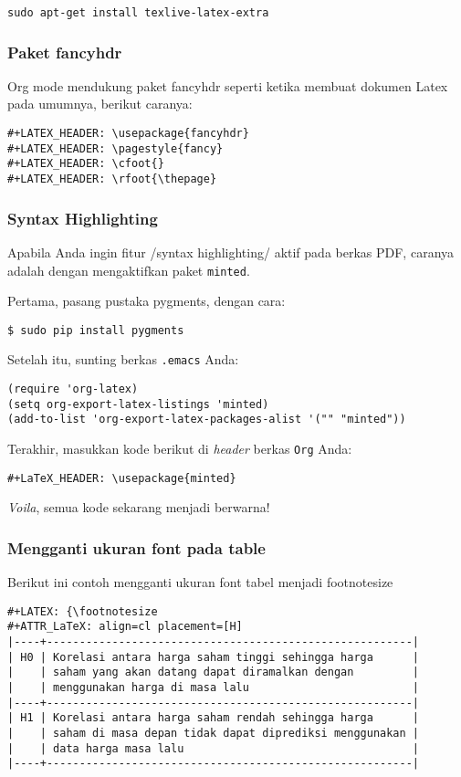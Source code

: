 \documentclass{article}
\begin{document}
\begin{verbatim}
sudo apt-get install texlive-latex-extra
\end{verbatim}

\subsubsection{Paket fancyhdr}
Org mode mendukung paket fancyhdr seperti ketika membuat dokumen Latex
pada umumnya, berikut caranya:

\begin{verbatim}
#+LATEX_HEADER: \usepackage{fancyhdr}
#+LATEX_HEADER: \pagestyle{fancy}
#+LATEX_HEADER: \cfoot{}
#+LATEX_HEADER: \rfoot{\thepage}
\end{verbatim}

\subsubsection{Syntax Highlighting}
Apabila Anda ingin fitur /syntax highlighting/ aktif pada berkas PDF,
caranya adalah dengan mengaktifkan paket \verb=minted=.

Pertama, pasang pustaka pygments, dengan cara:

\begin{verbatim}
$ sudo pip install pygments
\end{verbatim}

Setelah itu, sunting berkas \verb=.emacs= Anda:

\begin{verbatim}
(require 'org-latex)
(setq org-export-latex-listings 'minted)
(add-to-list 'org-export-latex-packages-alist '("" "minted"))
\end{verbatim}

Terakhir, masukkan kode berikut di \emph{header} berkas \verb=Org= Anda:
\begin{verbatim}
#+LaTeX_HEADER: \usepackage{minted}
\end{verbatim}

\emph{Voila}, semua kode sekarang menjadi berwarna!

\subsubsection{Mengganti ukuran font pada table}
Berikut ini contoh mengganti ukuran font tabel menjadi footnotesize
\begin{verbatim}
#+LATEX: {\footnotesize
#+ATTR_LaTeX: align=cl placement=[H]
|----+--------------------------------------------------------|
| H0 | Korelasi antara harga saham tinggi sehingga harga      |
|    | saham yang akan datang dapat diramalkan dengan         |
|    | menggunakan harga di masa lalu                         |
|----+--------------------------------------------------------|
| H1 | Korelasi antara harga saham rendah sehingga harga      |
|    | saham di masa depan tidak dapat diprediksi menggunakan |
|    | data harga masa lalu                                   |
|----+--------------------------------------------------------|
\end{verbatim}
\end{document}
